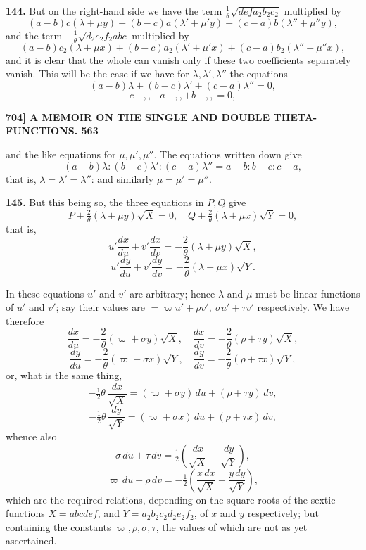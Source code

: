 \documentclass[11pt]{article}
\begin{document}
\medskip
\textbf{144.} But on the right-hand side we have the term $\tfrac{1}{\theta}\sqrt{defa_2b_2c_2}$ multiplied by
\[
(a - b)c(\lambda + \mu y) + (b - c)a(\lambda' + \mu' y) + (c - a)b(\lambda'' + \mu'' y),
\]
and the term $-\tfrac{1}{\theta}\sqrt{d_2e_2f_2abc}$ multiplied by
\[
(a - b)c_2(\lambda + \mu x) + (b - c)a_2(\lambda' + \mu' x) + (c - a)b_2(\lambda'' + \mu'' x),
\]
and it is clear that the whole can vanish only if these two coefficients separately vanish. This will be the case if we have for $\lambda, \lambda', \lambda''$ the equations
\[
(a - b)\lambda + (b - c)\lambda' + (c - a)\lambda'' = 0,
\]
\[
c\quad,, + a\quad,, + b\quad,, = 0,
\]

\newpage
\noindent\textbf{704] \quad A MEMOIR ON THE SINGLE AND DOUBLE THETA-FUNCTIONS. \hfill 563}

\medskip
and the like equations for $\mu, \mu', \mu''$. The equations written down give
\[
(a - b)\lambda : (b - c)\lambda' : (c - a)\lambda'' = a - b : b - c : c - a,
\]
that is, $\lambda = \lambda' = \lambda''$: and similarly $\mu = \mu' = \mu''$.

\medskip
\textbf{145.} But this being so, the three equations in $P, Q$ give
\[
P + \tfrac{2}{\theta}(\lambda + \mu y)\sqrt{X} = 0,\quad Q + \tfrac{2}{\theta}(\lambda + \mu x)\sqrt{Y} = 0,
\]
that is,
\[
u'\frac{dx}{du}+v'\frac{dx}{dv}
=-\frac{2}{\theta}(\lambda+\mu y)\sqrt{X},
\]
\[
u'\frac{dy}{du}+v'\frac{dy}{dv}
=-\frac{2}{\theta}(\lambda+\mu x)\sqrt{Y}.
\]

In these equations $u'$ and $v'$ are arbitrary; hence $\lambda$ and $\mu$ must be linear functions of $u'$ and $v'$; say their values are $= \varpi u' + \rho v',\ \sigma u' + \tau v'$ respectively. We have therefore
\[
\frac{dx}{du}=-\frac{2}{\theta}(\varpi+\sigma y)\sqrt{X},\quad
\frac{dx}{dv}=-\frac{2}{\theta}(\rho+\tau y)\sqrt{X},
\]
\[
\frac{dy}{du}=-\frac{2}{\theta}(\varpi+\sigma x)\sqrt{Y},\quad
\frac{dy}{dv}=-\frac{2}{\theta}(\rho+\tau x)\sqrt{Y},
\]
or, what is the same thing,
\[
-\tfrac{1}{2}\theta\,\frac{dx}{\sqrt{X}}=(\varpi+\sigma y)\,du+(\rho+\tau y)\,dv,
\]
\[
-\tfrac{1}{2}\theta\,\frac{dy}{\sqrt{Y}}=(\varpi+\sigma x)\,du+(\rho+\tau x)\,dv,
\]
whence also
\[
\sigma\,du+\tau\,dv=\tfrac{1}{2}\!\left(\frac{dx}{\sqrt{X}}-\frac{dy}{\sqrt{Y}}\right),
\]
\[
\varpi\,du+\rho\,dv=-\tfrac{1}{2}\!\left(\frac{x\,dx}{\sqrt{X}}-\frac{y\,dy}{\sqrt{Y}}\right),
\]
which are the required relations, depending on the square roots of the sextic functions $X = abcdef$, and $Y = a_2b_2c_2d_2e_2f_2$, of $x$ and $y$ respectively; but containing the constants $\varpi, \rho, \sigma, \tau$, the values of which are not as yet ascertained.
\end{document}
